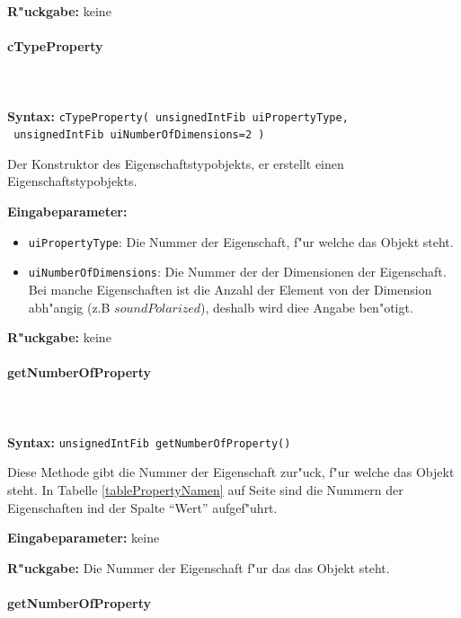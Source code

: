 \bigskip\noindent
\textbf{R"uckgabe:} keine


\paragraph{cTypeProperty}

\ \\\\\noindent
\textbf{Syntax:} \verb|cTypeProperty( unsignedIntFib uiPropertyType,| \\\verb| unsignedIntFib uiNumberOfDimensions=2 )|

\bigskip\noindent
Der Konstruktor des Eigenschaftstypobjekts, er erstellt einen Eigenschaftstypobjekts.

\bigskip\noindent
\textbf{Eingabeparameter:}
\begin{itemize}
 \item \verb|uiPropertyType|: Die Nummer der Eigenschaft, f"ur welche das Objekt steht.
 \item \verb|uiNumberOfDimensions|: Die Nummer der der Dimensionen der Eigenschaft. Bei manche Eigenschaften ist die Anzahl der Element von der Dimension abh"angig (z.B $soundPolarized$), deshalb wird diee Angabe ben"otigt.
\end{itemize}

\bigskip\noindent
\textbf{R"uckgabe:} keine


\paragraph{getNumberOfProperty}

\ \\\\\noindent
\textbf{Syntax:} \verb|unsignedIntFib getNumberOfProperty()|

\bigskip\noindent
Diese Methode gibt die Nummer der Eigenschaft zur"uck, f"ur welche das Objekt steht.
In Tabelle \ref{tablePropertyNamen} auf Seite \pageref{tablePropertyNamen} sind die Nummern der Eigenschaften ind der Spalte ``Wert'' aufgef"uhrt.

\bigskip\noindent
\textbf{Eingabeparameter:} keine

\bigskip\noindent
\textbf{R"uckgabe:} Die Nummer der Eigenschaft f"ur das das Objekt steht.


\paragraph{getNumberOfProperty}

